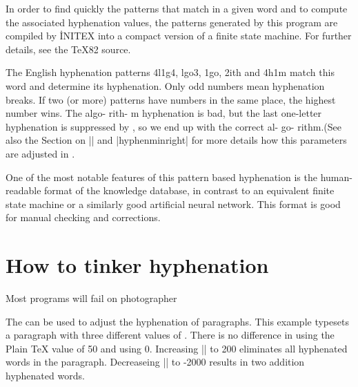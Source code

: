{In order to find quickly the patterns that match in a given word and to
compute the associated hyphenation values, the patterns generated by this
program are compiled by \.{INITEX} into a compact version of a finite
state machine.  For further details, see the \TeX 82 source.


The
\tex English hyphenation patterns 4l1g4, lgo3, 1go,
2ith and 4h1m match this word and determine its
hyphenation. Only odd numbers mean hyphenation
breaks. If two (or more) patterns have numbers in
the same place, the highest number wins. The algo-
rith- m hyphenation is bad, but the last one-letter
hyphenation is suppressed by \tex, so we end up with
the correct al- go- rithm.(See also the Section on |\hyphenminleft| and |hyphenminright| for more details
how this parameters are adjusted in \tex.

One of the most notable features of this pattern based
hyphenation is the human-readable format of
the knowledge database, in contrast to an equivalent
finite state machine or a similarly good artificial neural
network. This format is good for manual checking and
corrections.



\section*{How to tinker hyphenation}
Most programs will fail on photographer

\bigskip
{}
\bigskip

The  can be used to adjust the hyphenation of paragraphs. 
This example typesets a paragraph with three different values of . 
There is no difference in using the Plain TeX value of 50 and using 0. 
Increasing |\hyphenpenalty| to 200 eliminates all hyphenated words in the paragraph. 
Decreaseing |\hyphenpenalty|  to -2000 results in two addition hyphenated words.

\bigskip


}
